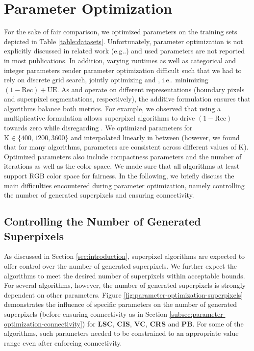 \documentclass[5p]{elsarticle}
\makeatletter
\DeclareRobustCommand\onedot{\futurelet\@let@token\@onedot}
\def\@onedot{\ifx\@let@token.\else.\null\fi\xspace}
\def\eg{{e.g}\onedot} \def\Eg{{E.g}\onedot}
\def\ie{{i.e}\onedot} \def\Ie{{I.e}\onedot}
\def\CISr{\textbf{CIS}\xspace}
\def\CRSr{\textbf{CRS}\xspace}
\def\PBr{\textbf{PB}\xspace}
\def\VCr{\textbf{VC}\xspace}
\def\LSCr{\textbf{LSC}\xspace}
\def\K{\text{K}\xspace}
\def\UE{\text{UE}\xspace}
\def\Rec{\text{Rec}\xspace}
\makeatother
\begin{document}
\section{Parameter Optimization}
\label{sec:parameter-optimization}

For the sake of fair comparison, we optimized parameters on the training sets depicted in Table \ref{table:datasets}.
Unfortunately, parameter optimization is not explicitly discussed in related work (\eg \cite{SchickFischerStiefelhagen:2012, AchantaShajiSmithLucchiFuaSuesstrunk:2012, NeubertProtzel:2012, SchickFischerStiefelhagen:2012})
and used parameters are not reported in most publications. In addition, varying runtimes as well as
categorical and integer parameters render parameter optimization difficult such that
we had to rely on discrete grid search, jointly optimizing \Rec and \UE, \ie minimizing $(1 - \Rec) + \UE$.
As \Rec and \UE operate on different representations (boundary pixels and superpixel segmentations, respectively),
the additive formulation ensures that algorithms balance both metrics. For example, we observed 
that using a multiplicative formulation allows superpixel algorithms to drive $(1 - \Rec)$ towards zero while disregarding \UE.
We optimized parameters for $\K \in \{400, 1200, 3600\}$ and interpolated linearly in between (however,
we found that for many algorithms, parameters are consistent across different values of $\K$).
Optimized parameters also include compactness parameters and the number of iterations
as well as the color space. We made sure that all algorithms at least support RGB color space for fairness.
In the following, we briefly discuss the main difficulties encountered during parameter optimization, namely controlling the number
of generated superpixels and ensuring connectivity.

\subsection{Controlling the Number of Generated Superpixels}
\label{subsec:parameter-optimization-superpixels}

As discussed in Section \ref{sec:introduction}, superpixel algorithms are expected
to offer control over the number of generated superpixels. We further expect the
algorithms to meet the desired number of superpixels within acceptable bounds. For
several algorithms, however, the number of generated superpixels is strongly dependent
on other parameters. Figure \ref{fig:parameter-optimization-superpixels} demonstrates the
influence of specific parameters on the number of generated superpixels
(before ensuring connectivity as in Section \ref{subsec:parameter-optimization-connectivity})
for \LSCr, \CISr, \VCr, \CRSr and \PBr. For some of the algorithms, such parameters needed to be constrained
to an appropriate value range even after enforcing connectivity.
\end{document}
